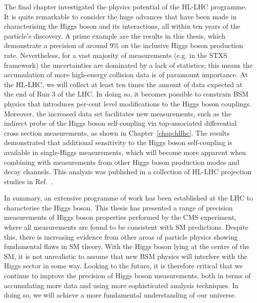 The final chapter investigated the physics potential of the HL-LHC programme. It is quite remarkable to consider the huge advances that have been made in characterising the Higgs boson and its interactions, all within ten years of the particle's discovery. A prime example are the \Hgg results in this thesis, which demonstrate a precision of around 9\% on the inclusive Higgs boson production rate. Nevertheless, for a vast majority of measurements (e.g. in the STXS framework) the uncertainties are dominated by a lack of statistics; this means the accumulation of more high-energy collision data is of paramount importance. At the HL-LHC, we will collect at least ten times the amount of data expected at the end of Run 3 of the LHC. In doing so, it becomes possible to constrain BSM physics that introduces per-cent level modifications to the Higgs boson couplings. Moreover, the increased data set facilitates new measurements, such as the indirect probe of the Higgs boson self-coupling via top-associated differential cross section measurements, as shown in Chapter~\ref{chap:hllhc}. The results demonstrated that additional sensitivity to the Higgs boson self-coupling is available in single-Higgs measurements, which will become more apparent when combining with measurements from other Higgs boson production modes and decay channels. This analysis was published in a collection of HL-LHC projection studies in Ref.~\cite{Cepeda:2019klc}.

In summary, an extensive programme of work has been established at the LHC to characterise the Higgs boson. This thesis has presented a range of precision measurements of Higgs boson properties performed by the CMS experiment, where all measurements are found to be consistent with SM predictions. Despite this, there is increasing evidence from other areas of particle physics showing fundamental flaws in SM theory. With the Higgs boson lying at the centre of the SM, it is not unrealistic to assume that new BSM physics will interfere with the Higgs sector in some way. Looking to the future, it is therefore critical that we continue to improve the precision of Higgs boson measurements, both in terms of accumulating more data and using more sophisticated analysis techniques. In doing so, we will achieve a more fundamental understanding of our universe.